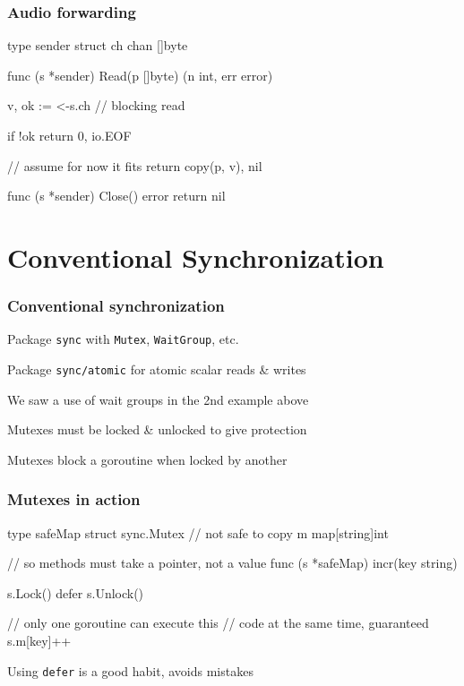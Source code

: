 \documentclass[handout,compress,t,11pt]{beamer}
\begin{document}
\begin{frame}[fragile]
    \frametitle{Audio forwarding}
\begin{golang}
type sender struct {
	ch chan []byte
}

func (s *sender) Read(p []byte) (n int, err error) {
	v, ok := <-s.ch  // blocking read

	if !ok {
		return 0, io.EOF
	}

	// assume for now it fits
	return copy(p, v), nil
}

func (s *sender) Close() error {
	return nil
}
\end{golang}
\end{frame}


\section{Conventional Synchronization}

\begin{frame}[fragile]
    \frametitle{Conventional synchronization}
    Package \verb|sync| with \verb|Mutex|, \verb|WaitGroup|, etc. \par
    \vspace{\baselineskip}
    Package \verb|sync/atomic| for atomic scalar reads \& writes \par
    \vspace{2\baselineskip}
    We saw a use of wait groups in the 2nd example above  \par
    \vspace{2\baselineskip}
    Mutexes must be locked \& unlocked to give protection \par
    \vspace{\baselineskip}
    Mutexes block a goroutine when locked by another
\end{frame}

\begin{frame}[fragile]
    \frametitle{Mutexes in action}
\begin{golang}
type safeMap struct {
    sync.Mutex         // not safe to copy
    m map[string]int
}

// so methods must take a pointer, not a value
func (s *safeMap) incr(key string) {
    s.Lock()
    defer s.Unlock()
    
    // only one goroutine can execute this
    // code at the same time, guaranteed
    s.m[key]++
}
\end{golang}
\vspace{\baselineskip}
Using \verb|defer| is a good habit, avoids mistakes
\end{frame}
\end{document}
